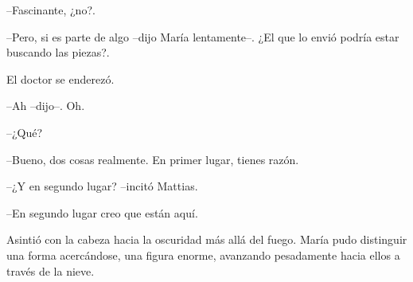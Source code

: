 --Fascinante, ¿no?.



--Pero, si es parte de algo --dijo María lentamente--. ¿El que lo envió podría estar buscando las piezas?.



El doctor se enderezó. 


--Ah --dijo--. Oh.



--¿Qué?



--Bueno, dos cosas realmente. En primer lugar, tienes razón.



--¿Y en segundo lugar? --incitó Mattias.



--En segundo lugar creo que están aquí.



Asintió con la cabeza hacia la oscuridad más allá del fuego. María pudo distinguir una forma acercándose, una figura enorme, avanzando pesadamente hacia ellos a través de la nieve.
